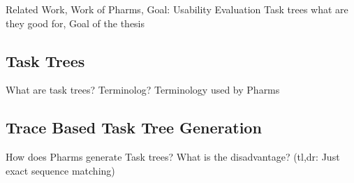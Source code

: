 Related Work, Work of Pharms, Goal: Usability Evaluation \citep{harms2013}
Task trees what are they good for, Goal of the thesis
\subsection{Task Trees}
What are task trees? Terminolog? Terminology used by Pharms
\subsection{Trace Based Task Tree Generation}
How does Pharms generate Task trees? What is the disadvantage? (tl,dr: Just exact sequence matching)


